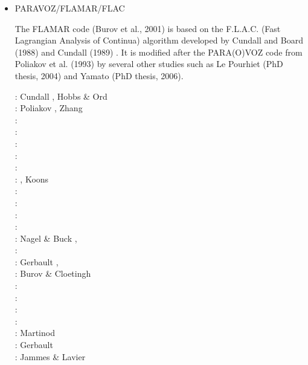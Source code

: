 \begin{itemize}
\item PARAVOZ/FLAMAR/FLAC 

The FLAMAR code (Burov et al., 2001) is based on the
F.L.A.C. (Fast Lagrangian Analysis of Continua) algorithm developed by Cundall and Board (1988) 
and Cundall (1989) \cite{cund89}. It is modified after the PARA(O)VOZ code from 
Poliakov et al. (1993) \cite{pocp93} by several
other studies such as Le Pourhiet (PhD thesis, 2004) and Yamato (PhD thesis, 2006).

\begin{scriptsize}
\nineteeneightynine: Cundall \cite{cund89}, Hobbs \& Ord \cite{hoor89}\\
\nineteenninetythree: Poliakov \etal \cite{pocp93}, Zhang \etal \cite{zhhj93}\\
\nineteenninetyfour: \cite{wizh94}\\
\nineteenninetysix: \cite{zhho96}\\
\nineteenninetyeight: \cite{gepd98}\\
\twothousand: \cite{labp00}\\
\twothousandone: \cite{bujl01}\cite{bupo01}\\
\twothousandtwo: \cite{bast02}\cite{clbb02}, Koons \etal \cite{kozc02}\\
\twothousandthree: \cite{hags03}\cite{gehd03}\cite{upke03}\\
\twothousandfour: \cite{guhl04}\cite{gewi04}\cite{toba04}\cite{tibb04}\cite{clbm04}\cite{tobj04}\\
\twothousandfive: \cite{bugu05}\\
\twothousandsix: \cite{buwa06}\cite{lemm06}\\
\twothousandseven: Nagel \& Buck \cite{nabu07}, \cite{yaab07}\cite{buto07}\cite{chem07}\\
\twothousandeight: \cite{yaba08}\cite{tibb08}\cite{buya08}\\
\twothousandnine: Gerbault \etal \cite{gecm09}, \cite{yahb09}\cite{bucl09}\cite{tigv09}\cite{yamb09}\\
\twothousandten: Burov \& Cloetingh \cite{bucl10}\\
\twothousandtwelve: \cite{anwb12}\cite{gech12}\cite{gubc12}\cite{gerb12}\\
\twothousandthirteen: \cite{wabd13}\cite{frbm13}\cite{tibb13}\\
\twothousandfourteen: \cite{frba14}\cite{gagb14}\cite{bufa14}\cite{bufy14b}\\
\twothousandfifteen: \cite{wulc15}\cite{gebw15}\cite{svlh15}\\
\twothousandsixteen: Martinod \etal \cite{marl16}\\
\twothousandeighteen: Gerbault \etal \cite{gesr18}\\
\twothousandnineteen: Jammes \& Lavier \cite{jala19}
\end{scriptsize}


\end{itemize}
